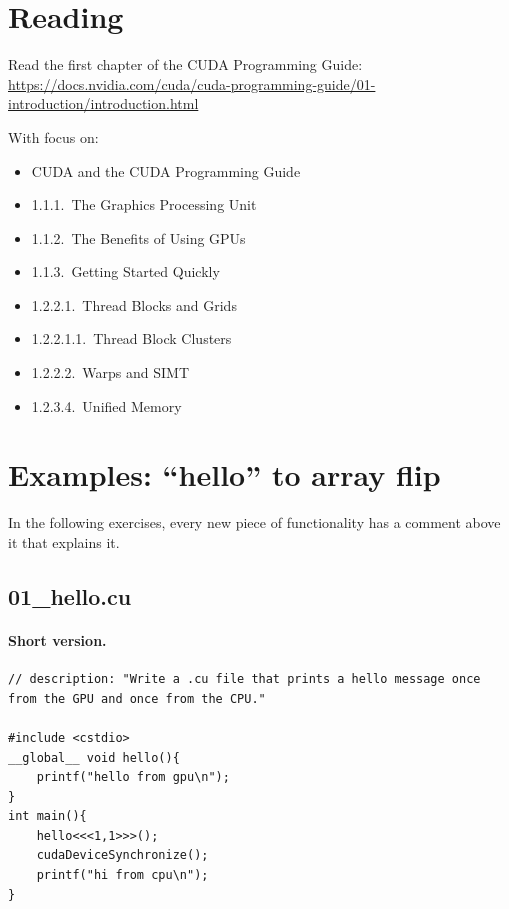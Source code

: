 \documentclass[main.tex]{subfiles}
\begin{document}

\section{Reading}

Read the first chapter of the CUDA Programming Guide:\\
\url{https://docs.nvidia.com/cuda/cuda-programming-guide/01-introduction/introduction.html}

With focus on:
\begin{itemize}[nosep]
  \item CUDA and the CUDA Programming Guide
  \item 1.1.1.\ The Graphics Processing Unit
  \item 1.1.2.\ The Benefits of Using GPUs
  \item 1.1.3.\ Getting Started Quickly
  \item 1.2.2.1.\ Thread Blocks and Grids
  \item 1.2.2.1.1.\ Thread Block Clusters
  \item 1.2.2.2.\ Warps and SIMT
  \item 1.2.3.4.\ Unified Memory
\end{itemize}

\section{Examples: ``hello'' to array flip}

In the following exercises, every new piece of functionality has a comment above it that explains it.

\subsection{01\_hello.cu}
\paragraph{Short version.}
\begin{lstlisting}[language=CUDA]
// description: "Write a .cu file that prints a hello message once from the GPU and once from the CPU."

#include <cstdio>
__global__ void hello(){
    printf("hello from gpu\n");
}
int main(){
    hello<<<1,1>>>();
    cudaDeviceSynchronize();
    printf("hi from cpu\n");
}
\end{lstlisting}
\end{document}
